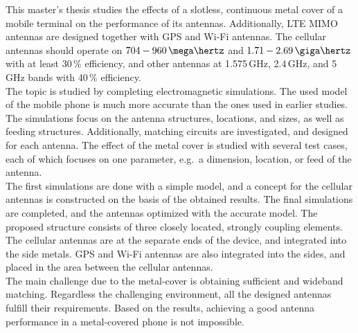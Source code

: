 This master's thesis studies the effects of a slotless, continuous metal cover of a mobile terminal on the performance of its antennas. Additionally, LTE MIMO antennas are designed together with GPS and Wi-Fi antennas. The cellular antennas should operate on $704-960\,\mega\hertz$ and $1.71-2.69\,\giga\hertz$ with at least 30\,\% efficiency, and other antennas at 1.575\,GHz, 2.4\,GHz, and 5\,GHz bands with 40\,\% efficiency. \\

The topic is studied by completing electromagnetic simulations. The used model of the mobile phone is much more accurate than the ones used in earlier studies. The simulations focus on the antenna structures, locations, and sizes, as well as feeding structures. Additionally, matching circuits are investigated, and designed for each antenna. The effect of the metal cover is studied with several test cases, each of which focuses on one parameter, e.g.\ a dimension, location, or feed of the antenna. \\

The first simulations are done with a simple model, and a concept for the cellular antennas is constructed on the basis of the obtained results. The final simulations are completed, and the antennas optimized with the accurate model. The proposed structure consists of three closely located, strongly coupling elements. The cellular antennas are at the separate ends of the device, and integrated into the side metals. GPS and Wi-Fi antennas are also integrated into the sides, and placed in the area between the cellular antennas. \\

The main challenge due to the metal-cover is obtaining sufficient and wideband matching. Regardless the challenging environment, all the designed antennas fulfill their requirements. Based on the results, achieving a good antenna performance in a metal-covered phone is not impossible.